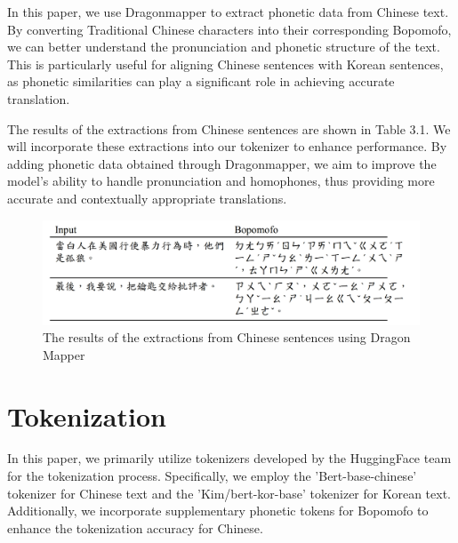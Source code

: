 \documentclass[PhD]{PHlab-thesis}
\begin{document}
In this paper, we use Dragonmapper to extract phonetic data from Chinese text. By converting Traditional Chinese characters into their corresponding Bopomofo, we can better understand the pronunciation and phonetic structure of the text. This is particularly useful for aligning Chinese sentences with Korean sentences, as phonetic similarities can play a significant role in achieving accurate translation.

The results of the extractions from Chinese sentences are shown in Table 3.1. We will incorporate these extractions into our tokenizer to enhance performance. By adding phonetic data obtained through Dragonmapper, we aim to improve the model's ability to handle pronunciation and homophones, thus providing more accurate and contextually appropriate translations.

\begin{figure}[h!]
  \centering
  \includegraphics[width=\linewidth]{tab_3_4.jpg}
  \captionsetup{type=table}
  \caption{The results of the extractions from Chinese sentences using Dragon Mapper}
  \label{tab:dragonmapper}
\end{figure}


\section{Tokenization}
In this paper, we primarily utilize tokenizers developed by the HuggingFace team for the tokenization process. Specifically, we employ the 'Bert-base-chinese' tokenizer for Chinese text and the 'Kim/bert-kor-base' tokenizer for Korean text. Additionally, we incorporate supplementary phonetic tokens for Bopomofo to enhance the tokenization accuracy for Chinese.
\end{document}
